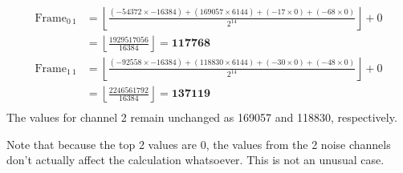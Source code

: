 \begin{align*}
\text{Frame}_{0~1} &= \left\lfloor\frac{(-54372 \times -16384) + (169057 \times 6144) + (-17 \times 0) + (-68 \times 0)}{2 ^ {14}}\right\rfloor + 0 \\
&= \left\lfloor\frac{1929517056}{16384}\right\rfloor = \textbf{117768} \\
\text{Frame}_{1~1} &= \left\lfloor\frac{(-92558 \times -16384) + (118830 \times 6144) + (-30 \times 0) + (-48 \times 0)}{2 ^ {14}}\right\rfloor + 0 \\
&= \left\lfloor\frac{2246561792}{16384}\right\rfloor = \textbf{137119} \\
\end{align*}
The values for channel 2 remain unchanged as 169057 and 118830, respectively.
\par
Note that because the top 2  values are 0,
the values from the 2 noise channels don't actually affect the
calculation whatsoever.
This is not an unusual case.
